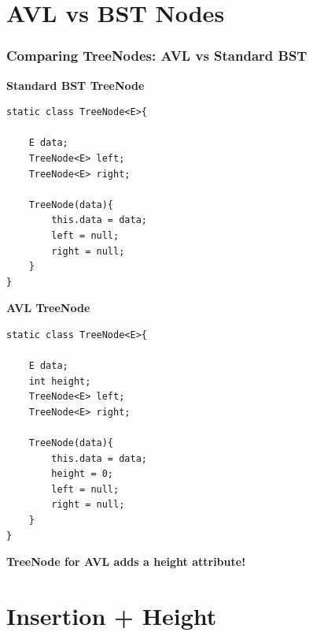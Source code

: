 \documentclass{beamer}
\begin{document}
\section{AVL vs BST Nodes}
\begin{frame}[fragile]
    \frametitle{Comparing TreeNodes: AVL vs Standard BST}
    \begin{minipage}{0.45\textwidth}
        \textbf{Standard BST TreeNode}
        \begin{lstlisting}[frame=trBL]
static class TreeNode<E>{

    E data;
    TreeNode<E> left;
    TreeNode<E> right;

    TreeNode(data){
        this.data = data;
        left = null;
        right = null;
    }
}
        \end{lstlisting}
    \end{minipage}
    \hfill
    \begin{minipage}{0.45\textwidth}
        \textbf{AVL TreeNode}
        \begin{lstlisting}[frame=trBL]
static class TreeNode<E>{

    E data;
    int height;
    TreeNode<E> left;
    TreeNode<E> right;

    TreeNode(data){
        this.data = data;
        height = 0;
        left = null;
        right = null;
    }
}
        \end{lstlisting}
    \end{minipage}
    \vfill
    \textbf{TreeNode for AVL adds a height attribute!}
    \vfill
\end{frame}


\section{Insertion + Height}
\end{document}
